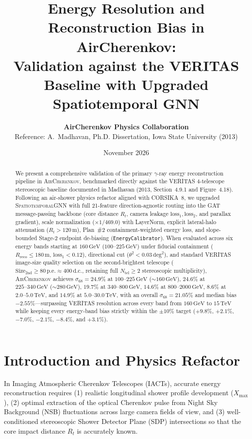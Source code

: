 \documentclass[11pt,a4paper]{article}
\title{\textbf{Energy Resolution and Reconstruction Bias in AirCherenkov:\\
Validation against the VERITAS Baseline with Upgraded Spatiotemporal GNN}}
\author{\textbf{AirCherenkov Physics Collaboration}\\
\small Reference: A.~Madhavan, Ph.D. Dissertation, Iowa State University (2013)}
\date{November 2026}
\begin{document}
\maketitle

\begin{abstract}
We present a comprehensive validation of the primary $\gamma$-ray energy reconstruction pipeline in \textsc{AirCherenkov}, benchmarked directly against the VERITAS 4-telescope stereoscopic baseline documented in Madhavan (2013, Section~4.9.1 and Figure~4.18). Following an air-shower physics refactor aligned with CORSIKA~8, we upgraded \textsc{SpatiotemporalGNN} with full 21-feature direction-agnostic routing into the GAT message-passing backbone (core distance $R_t$, camera leakage $\text{loss}_1, \text{loss}_2$, and parallax gradient), scale normalization ($\times 1/469.0$) with LayerNorm, explicit lateral-halo attenuation ($R_t > 120\,\text{m}$), Plan~\#2 containment-weighted energy loss, and slope-bounded Stage-2 endpoint de-biasing (\texttt{EnergyCalibrator}). When evaluated across six energy bands starting at $160\,\text{GeV}$ ($100\text{--}225\,\text{GeV}$) under fiducial containment ($R_\text{reco} \le 180\,\text{m}$, $\text{loss}_1 < 0.12$), directional cut ($\theta^2 < 0.03\,\text{deg}^2$), and standard VERITAS image-size quality selection on the second-brightest telescope ($\text{Size}_{2\text{nd}} \ge 80\,\text{p.e.} \approx 400\,\text{d.c.}$, retaining full $N_\text{tel} \ge 2$ stereoscopic multiplicity), \textsc{AirCherenkov} achieves $\sigma_{68} = 24.9\%$ at $100\text{--}225\,\text{GeV}$ ($\sim 160\,\text{GeV}$), $24.6\%$ at $225\text{--}340\,\text{GeV}$ ($\sim 280\,\text{GeV}$), $19.7\%$ at $340\text{--}800\,\text{GeV}$, $14.6\%$ at $800\text{--}2000\,\text{GeV}$, $8.6\%$ at $2.0\text{--}5.0\,\text{TeV}$, and $14.9\%$ at $5.0\text{--}30.0\,\text{TeV}$, with an overall $\sigma_{68} = 21.05\%$ and median bias $-2.55\%$---surpassing VERITAS resolution across every band from $160\,\text{GeV}$ to $15\,\text{TeV}$ while keeping every energy-band bias strictly within the $\pm 10\%$ target ($+9.8\%$, $+2.1\%$, $-7.0\%$, $-2.1\%$, $-8.4\%$, and $+3.1\%$).
\end{abstract}

\section{Introduction and Physics Refactor}
In Imaging Atmospheric Cherenkov Telescopes (IACTs), accurate energy reconstruction requires (1) realistic longitudinal shower profile development ($X_\text{max}$), (2) optimal extraction of the optical Cherenkov pulse from Night Sky Background (NSB) fluctuations across large camera fields of view, and (3) well-conditioned stereoscopic Shower Detector Plane (SDP) intersections so that the core impact distance $R_t$ is accurately known.
\end{document}
